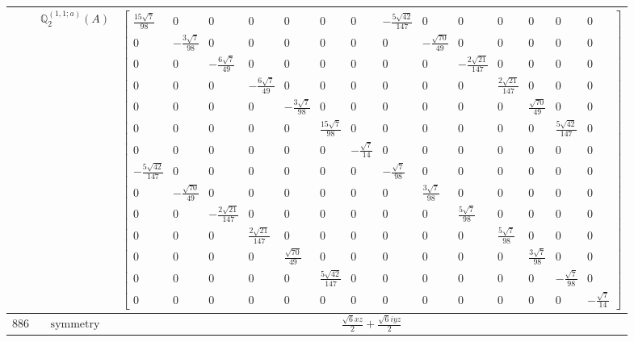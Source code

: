 \documentclass[fleqn,8pt,landscape]{jsarticle}
\begin{document}
\begin{longtable}{ccc}
$  $ & $ \mathbb{Q}_{2}^{(1,1;a)}(A) $ & $ \begin{bmatrix} \frac{15 \sqrt{7}}{98} & 0 & 0 & 0 & 0 & 0 & 0 & - \frac{5 \sqrt{42}}{147} & 0 & 0 & 0 & 0 & 0 & 0 \\ 0 & - \frac{3 \sqrt{7}}{98} & 0 & 0 & 0 & 0 & 0 & 0 & - \frac{\sqrt{70}}{49} & 0 & 0 & 0 & 0 & 0 \\ 0 & 0 & - \frac{6 \sqrt{7}}{49} & 0 & 0 & 0 & 0 & 0 & 0 & - \frac{2 \sqrt{21}}{147} & 0 & 0 & 0 & 0 \\ 0 & 0 & 0 & - \frac{6 \sqrt{7}}{49} & 0 & 0 & 0 & 0 & 0 & 0 & \frac{2 \sqrt{21}}{147} & 0 & 0 & 0 \\ 0 & 0 & 0 & 0 & - \frac{3 \sqrt{7}}{98} & 0 & 0 & 0 & 0 & 0 & 0 & \frac{\sqrt{70}}{49} & 0 & 0 \\ 0 & 0 & 0 & 0 & 0 & \frac{15 \sqrt{7}}{98} & 0 & 0 & 0 & 0 & 0 & 0 & \frac{5 \sqrt{42}}{147} & 0 \\ 0 & 0 & 0 & 0 & 0 & 0 & - \frac{\sqrt{7}}{14} & 0 & 0 & 0 & 0 & 0 & 0 & 0 \\ - \frac{5 \sqrt{42}}{147} & 0 & 0 & 0 & 0 & 0 & 0 & - \frac{\sqrt{7}}{98} & 0 & 0 & 0 & 0 & 0 & 0 \\ 0 & - \frac{\sqrt{70}}{49} & 0 & 0 & 0 & 0 & 0 & 0 & \frac{3 \sqrt{7}}{98} & 0 & 0 & 0 & 0 & 0 \\ 0 & 0 & - \frac{2 \sqrt{21}}{147} & 0 & 0 & 0 & 0 & 0 & 0 & \frac{5 \sqrt{7}}{98} & 0 & 0 & 0 & 0 \\ 0 & 0 & 0 & \frac{2 \sqrt{21}}{147} & 0 & 0 & 0 & 0 & 0 & 0 & \frac{5 \sqrt{7}}{98} & 0 & 0 & 0 \\ 0 & 0 & 0 & 0 & \frac{\sqrt{70}}{49} & 0 & 0 & 0 & 0 & 0 & 0 & \frac{3 \sqrt{7}}{98} & 0 & 0 \\ 0 & 0 & 0 & 0 & 0 & \frac{5 \sqrt{42}}{147} & 0 & 0 & 0 & 0 & 0 & 0 & - \frac{\sqrt{7}}{98} & 0 \\ 0 & 0 & 0 & 0 & 0 & 0 & 0 & 0 & 0 & 0 & 0 & 0 & 0 & - \frac{\sqrt{7}}{14} \end{bmatrix} $ \\ \hline
$ 886 $ & $ \text{symmetry} $ & $ \frac{\sqrt{6} x z}{2} + \frac{\sqrt{6} i y z}{2} $ \\

\end{longtable}
\end{document}
